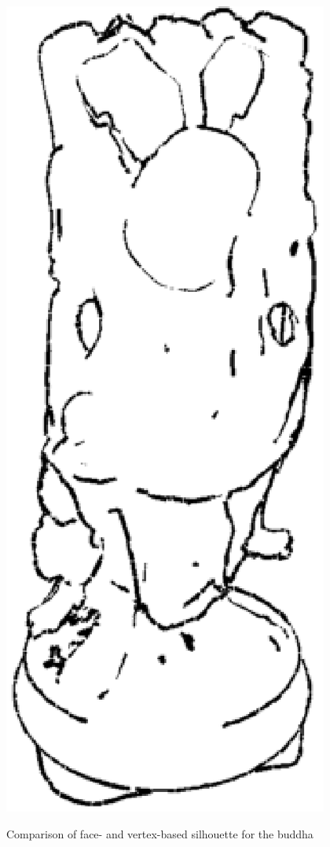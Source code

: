 \documentclass[a4paper,10pt,notitlepage]{scrreprt}
\begin{document}
\begin{figure}
{    \includegraphics[scale=0.4]{img-2-2/buddha-vertex.eps}}
 \caption{Comparison of face- and vertex-based silhouette for the buddha}
 \label{fig:silhouette-buddha}
\end{figure}
\end{document}
